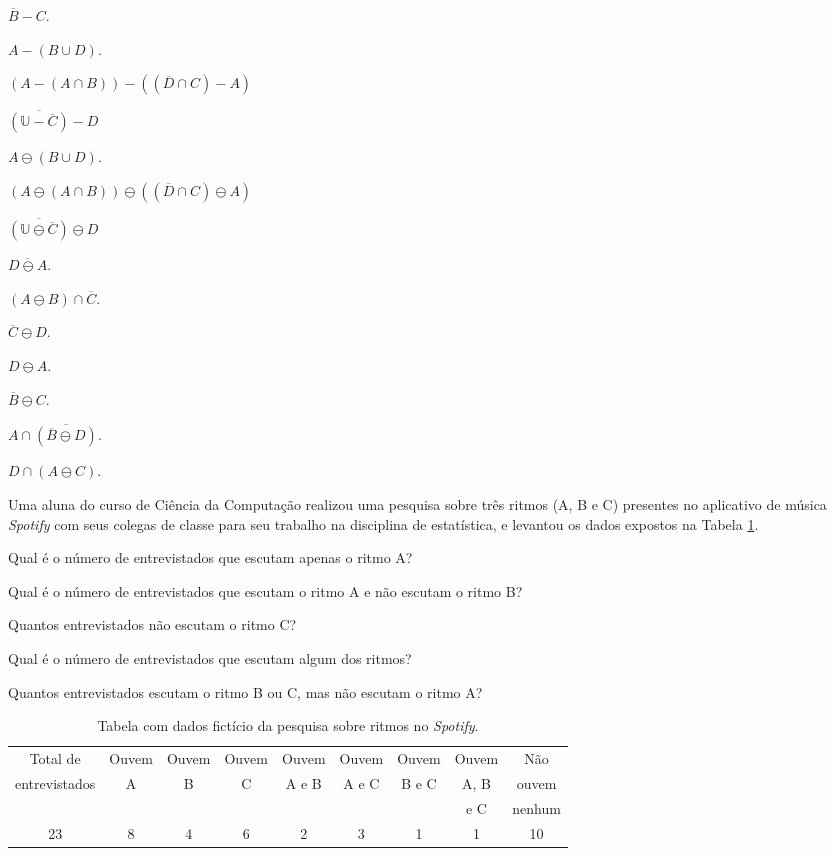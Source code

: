 \begin{exerList}
	\item $\overline{B} - C$.
	\item $A - (B \cup D)$.
	\item $(A - (A \cap B)) - ((\overline{D} \cap C) - A)$
	\item $\overline{(\mathbb{U} - \overline{C})} - D$
	\item $A \ominus (B \cup D)$.
	\item $(A \ominus (A \cap B)) \ominus ((\overline{D} \cap C) \ominus A)$
	\item $\overline{(\mathbb{U} \ominus \overline{C})} \ominus D$
	\item $\overline{D \ominus A}$.
	\item $(A \ominus B) \cap \overline{C}$.
	\item $\overline{C} \ominus D$.
	\item $D \ominus A$.
	\item $\overline{B} \ominus C$.
	\item $A \cap \overline{(\overline{B} \ominus D)}$.
	\item $D \cap (A \ominus C)$.
\end{exerList}

\begin{questao}\label{test:Conjuntos11}
	Uma aluna do curso de Ciência da Computação realizou uma pesquisa sobre três ritmos (A, B e C) presentes no aplicativo de música \textit{Spotify} com seus colegas de classe para seu trabalho na disciplina de estatística,  e levantou os dados expostos na Tabela \ref{tab:TabelaDeDados}.
\end{questao}

\begin{exerList}
	\item Qual é o número de entrevistados que escutam apenas o ritmo A?
	\item Qual é o número de entrevistados que escutam o ritmo A e não escutam o ritmo B?
	\item Quantos entrevistados não escutam o ritmo C?
	\item Qual é o número de entrevistados que escutam algum dos ritmos?
	\item Quantos entrevistados escutam o ritmo B ou C, mas não escutam o ritmo A?
\end{exerList}

\begin{table}[H]
	\scriptsize
	\centering
	\begin{tabular}{ccccccccc}
		\hline
		Total de&Ouvem&Ouvem&Ouvem&Ouvem&Ouvem&Ouvem&Ouvem&Não\\
		entrevistados&A&B&C&A e B&A e C&B e C&A, B&ouvem\\
    & & & & & & &e C&nenhum\\
		\hline
		23 & 8 & 4 & 6 & 2 & 3 & 1 & 1 & 10\\
		\hline
	\end{tabular}
	\caption{Tabela com dados fictício da pesquisa sobre ritmos no \textit{Spotify}.}
	\label{tab:TabelaDeDados}
\end{table}

